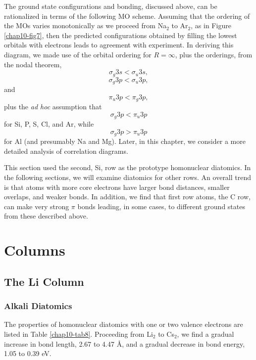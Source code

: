 The ground state configurations and bonding, discussed above, can be 
rationalized in terms of the following MO 
scheme.  Assuming that the ordering of the MOs 
varies monotonically as we proceed from Na$_2$ to Ar$_2$, as in Figure 
\ref{chap10-fig7}, then the predicted configurations obtained by
filling the lowest orbitals with electrons leads to agreement with
experiment.  In deriving this diagram, we made use of the orbital
ordering for $R = \infty$, plus the orderings, from the nodal theorem,
\begin{equation}
\sigma_g 3s < \sigma_u 3s ,
\end{equation}
\begin{equation}
\sigma_g 3p < \sigma_u 3p ,
\end{equation}
and
\begin{equation}
\pi_u 3p < \pi_g 3p ,
\end{equation}
plus the \emph{ad hoc} assumption that
\begin{equation}
\sigma_g 3p < \pi_u 3p
\end{equation}
for	Si, P, S, Cl, and Ar, while
\begin{equation}
\sigma_g 3p > \pi_u 3p
\end{equation}
for Al (and presumably Na and Mg).  Later, in this chapter, we
consider a more detailed analysis of correlation diagrams.

This section used the second, Si, row as the prototype homonuclear 
diatomics.  In the following sections, we will examine diatomics for 
other rows.  An overall trend is that atoms with more core electrons 
have larger bond distances, smaller overlaps, and weaker bonds.  In 
addition, we find that first row atoms, the C row, can make very 
strong $\pi$ bonds leading, in some cases, to different ground states 
from these described above.


\section{Columns}

\subsection{The Li Column}

\subsubsection{Alkali Diatomics}

The properties of homonuclear diatomics with one or two valence
electrons are listed in Table \ref{chap10-tab8}.  Proceeding from
Li$_2$ to Cs$_2$, we find a gradual increase in bond length, 2.67 to
4.47 \AA, and a gradual decrease in bond energy, 1.05 to 0.39 eV.
	
